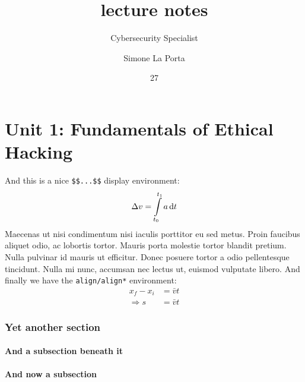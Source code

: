 \documentclass[english,course]{lecture}
\title{lecture notes}
\subtitle{Cybersecurity Specialist}
\author{Simone La Porta}
\date{27}{05}{2024}
\begin{document}

\part{Unit 1: Fundamentals of Ethical Hacking}











And this is a nice \texttt{\$\$...\$\$} display environment:
$$
\Delta v = \int\displaylimits_{t_0}^{t_1} a \, \textrm{d}t
$$
Maecenas ut nisi condimentum nisi iaculis porttitor eu sed metus. Proin faucibus aliquet odio, ac lobortis tortor. Mauris porta molestie tortor blandit pretium. Nulla pulvinar id mauris ut efficitur. Donec posuere tortor a odio pellentesque tincidunt. Nulla mi nunc, accumsan nec lectus ut, euismod vulputate libero.
%
And finally we have the \texttt{align/align*} environment:
\begin{align}
x_f - x_i &= \bar{v}t \nonumber\\
\Rightarrow s &= \bar{v}t
\end{align}
%
\section{Yet another section}
\subsection{And a subsection beneath it}
%
\subsection{And now a subsection}
\end{document}
